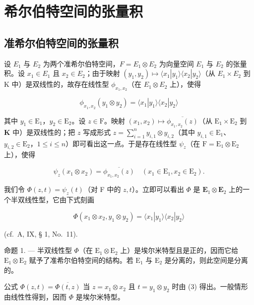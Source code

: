 \section{希尔伯特空间的张量积}

\subsection{准希尔伯特空间的张量积}

设 \(E_{1}\) 与 \(E_{2}\) 为两个准希尔伯特空间，\(F = E_{1} \otimes E_{2}\) 为向量空间 \(E_{1}\) 与 \(E_{2}\) 的张量积。设 \(x_{1} \in E_{1}\) 且 \(x_{2} \in E_{2}\)；由于映射 \((y_{1}, y_{2}) \mapsto \langle x_{1}|y_{1} \rangle \langle x_{2}|y_{2} \rangle\)（从 \(E_{1} \times E_{2}\) 到 K 中）是双线性的，故存在线性型 \(\phi_{x_{1},x_{2}}\)（在 \(E_{1} \otimes E_{2}\) 上），使得

\[
\phi_ {x _ {1}, x _ {2}} (y _ {1} \otimes y _ {2}) = \langle x _ {1} | y _ {1} \rangle \langle x _ {2} | y _ {2} \rangle\tag{1}
\]

其中 \(y_{1} \in \mathrm{E}_{1}\)，\(y_{2} \in \mathrm{E}_{2}\)。设 \(z \in \mathrm{F}\)。映射 \((x_{1}, x_{2}) \mapsto \overline{\phi_{x_{1},x_{2}}(z)}\)（从 \(\mathrm{E}_1 \times \mathrm{E}_2\) 到 \(\mathbf{K}\) 中）是双线性的；把 \(z\) 写成形式 \(z = \sum_{i=1}^{n} y_{i,1} \otimes y_{i,2}\)（其中 \(y_{i,1} \in \mathrm{E}_1\)、\(y_{i,2} \in \mathrm{E}_2\)，\(1 \leqslant i \leqslant n\)）即可看出这一点。于是存在线性型 \(\psi_z\)（在 \(\mathrm{F} = \mathrm{E}_1 \otimes \mathrm{E}_2\) 上），使得

\[
\psi_ {z} (x _ {1} \otimes x _ {2}) = \overline {{\phi_ {x _ {1} , x _ {2}} (z)}} \quad (x _ {1} \in \mathrm{E} _ {1}, x _ {2} \in \mathrm{E} _ {2}).\tag{2}
\]

我们令 \(\Phi(z, t) = \psi_z(t)\)（对 F 中的 \(z, t\)）。立即可以看出 \(\Phi\) 是 \(\mathbf{E}_1 \otimes \mathbf{E}_2\) 上的一个半双线性型，它由下式刻画

\[
\Phi (x _ {1} \otimes x _ {2}, y _ {1} \otimes y _ {2}) = \langle x _ {1} | y _ {1} \rangle \langle x _ {2} | y _ {2} \rangle\tag{3}
\]

(cf.~A, IX, § 1, No.~11).

命题 1. --- 半双线性型 \(\Phi\)（在 \(\mathrm{E}_1 \otimes \mathrm{E}_2\) 上）是埃尔米特型且是正的，因而它给 \(\mathrm{E}_1 \otimes \mathrm{E}_2\) 赋予了准希尔伯特空间的结构。若 \(\mathrm{E}_1\) 与 \(\mathrm{E}_2\) 是分离的，则此空间是分离的。

公式 \(\Phi(z, t) = \overline{\Phi(t, z)}\) 当 \(z = x_1 \otimes x_2\) 且 \(t = y_1 \otimes y_2\) 时由 (3) 得出。一般情形由线性性得到，因而 \(\Phi\) 是埃尔米特型。

